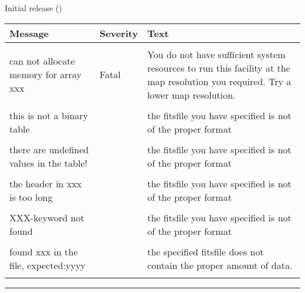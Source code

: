 \begin{release}
  \begin{relist}
    \item Initial release ()
  \end{relist}
\end{release}

\begin{messages}
{
\begin{tabular}{p{0.25\hsize} p{0.1\hsize} p{0.35\hsize}} \hline  
  \textbf{Message} & \textbf{Severity} & \textbf{Text} \\ \hline
                   &                   &   \\ %
can not allocate memory for array xxx &  Fatal & You do not have
                   sufficient system resources to run this
                   facility at the map resolution you required. 
  Try a lower map resolution.  \\ 
                   &                   &   \\ \hline %

this is not a binary table & & the fitsfile you have specified is not 
of the proper format \\
                   &                   &   \\ \hline %
there are undefined values in the table! & & the fitsfile you have specified is not 
of the proper format \\
                  &                   &   \\ \hline %
the header in xxx is too long & & the fitsfile you have specified is not 
of the proper format \\
                  &                   &   \\ \hline %
XXX-keyword not found & & the fitsfile you have specified is not 
of the proper format \\
                  &                   &   \\ \hline %
found xxx in the file, expected:yyyy & & the specified fitsfile does not
contain the proper amount of data. \\
                   &                   &   \\ \hline %



\end{tabular}
} 
\end{messages}

\rule{\hsize}{2mm}

\newpage
